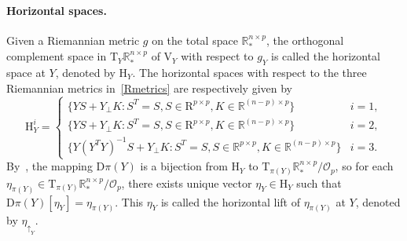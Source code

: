 \documentclass[11pt]{article}
\numberwithin{equation}{section}
\begin{document}


\paragraph{Horizontal spaces.} %
Given a Riemannian metric $g$ on the total space $\mathbb{R}_*^{n \times p}$, the orthogonal complement space in $\mathrm{T}_Y\mathbb{R}_*^{n\times p}$ of $\mathrm{V}_Y$ with respect to $g_Y$ is called the horizontal space at $Y$, denoted by $\mathrm{H}_Y$. The horizontal spaces with respect to the three Riemannian metrics in~\eqref{Rmetrics} are respectively given by
\begin{equation} \nonumber
	\mathrm{H}_Y^i = \begin{cases}
		\{YS+Y_\perp K:S^T=S,S\in\mathrm{R}^{p\times p},K\in\mathbb{R}^{(n-p)\times p}\} & i=1,\\ 
		\{YS+Y_\perp K:S^T=S,S\in\mathrm{R}^{p\times p},K\in\mathbb{R}^{(n-p)\times p}\} & i=2, \\
		\{Y(Y^TY)^{-1}S+Y_\perp K:S^T=S,S\in\mathbb{R}^{p\times p},K\in\mathbb{R}^{(n-p)\times p}\} & i=3.
	\end{cases}
\end{equation}
By~\cite[Section~3.5.8]{AbsMahSep2008}, the mapping $\mathrm{D}\pi(Y)$ is a bijection from $\mathrm{H}_Y$ to $\mathrm{T}_{\pi(Y)}\mathbb{R}_*^{n\times p}/\mathcal{O}_p$, so for each $\eta_{\pi(Y)}\in \mathrm{T}_{\pi(Y)}\mathbb{R}_*^{n\times p}/\mathcal{O}_p$, there exists unique vector $\eta_{Y}\in \mathrm{H}_Y$ such that $\mathrm{D}\pi(Y)[\eta_{Y}]=\eta_{\pi(Y)}$. This $\eta_{Y}$ is called the horizontal lift of $\eta_{\pi(Y)}$ at $Y$, denoted by $\eta_{\uparrow_Y}$.
\end{document}
